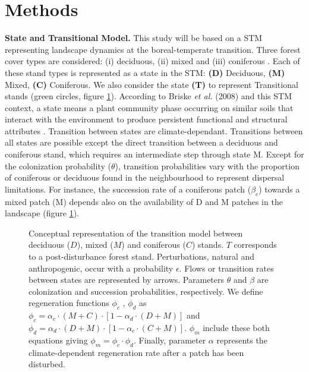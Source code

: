 \section{Methods}   

\textbf{State and Transitional Model.} This study will be based on a STM
representing landscape dynamics at the boreal-temperate transition. Three
forest cover types are considered: (i) deciduous, (ii) mixed and (iii)
coniferous \cite{Fisichelli2013}.  Each of these stand types is represented as
a state in the STM: \textbf{(D)} Deciduous, \textbf{(M)} Mixed, \textbf{(C)}
Coniferous. We also consider the state \textbf{(T)} to represent Transitional
stands (green circles, figure \ref{Model}).  According to Briske\textit{ et
al.} (2008) and this STM context, a state means a plant community phase
occurring on similar soils that interact with the environment to produce
persistent functional and structural attributes \cite{Briske2008}. Transition
between states are climate-dependant. Transitions between all states are
possible except the direct transition between a deciduous and coniferous
stand, which requires an intermediate step through state M. Except for the
colonization probability ($\theta$), transition probabilities vary with the
proportion of coniferous or deciduous found in the  neighbourhood to represent
dispersal limitations. For instance, the succession rate of a coniferous patch
($\beta_c$) towards a mixed patch (M) depends also on the availability of D
and M patches in the landscape (figure \ref{Model}).  \\

\begin{figure}
	
	\caption{Conceptual representation of the transition model between deciduous ($D$),
	mixed ($M$) and coniferous ($C$) stands. $T$ corresponds to a post-disturbance forest stand. Perturbations, natural and anthropogenic, occur with a probability $\epsilon$. 
	Flows or transition rates between states are represented by arrows.
	Parameters $\theta$ and $\beta$ are  colonization and succession probabilities,
	respectively. We define regeneration functions $\phi_c$ , $\phi_d$ as $\phi_c
	= \alpha_c \cdot (M+C) \cdot [1- \alpha_d \cdot (D+M)]$ and $\phi_d =
	\alpha_d \cdot (D+M) \cdot [1- \alpha_c \cdot (C+M)]$. $\phi_m$ include these both equations giving $\phi_m = \phi_c \cdot \phi_d$. Finally, parameter $\alpha$ represents the climate-dependent regeneration rate after a patch has been disturbed.}
	\label{Model}
	\vspace{1em}
\end{figure}

